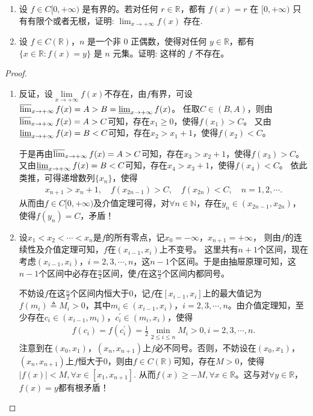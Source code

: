 \documentclass[../../main.tex]{subfiles}
\begin{document}
\begin{example}
\begin{enumerate}
\item 设 \(f\in C[0,+\infty)\) 是有界的。若对任何 \(r\in\mathbb{R}\)，都有 \(f(x)=r\) 在 \([0,+\infty)\) 只有有限个或者无根，证明:
$\lim_{x \to +\infty} f(x) \text{ 存在}.$

\item 设 \(f\in C(\mathbb{R})\)，\(n\) 是一个非 \(0\) 正偶数，使得对任何 \(y\in\mathbb{R}\)，都有 \(\{x\in\mathbb{R}:f(x)=y\}\) 是 \(n\) 元集。证明: 这样的 \(f\) 不存在。 
\end{enumerate}
\end{example}
\begin{proof}
\begin{enumerate}
\item 反证，设\(\lim\limits_{x \to +\infty} f(x)\)不存在，由\(f\)有界，可设\(\varlimsup_{x \to +\infty} f(x)=A > B=\varliminf_{x \to +\infty} f(x)\)。
任取\(C\in (B,A)\)，则由\(\varlimsup_{x \to +\infty} f(x)=A > C\)可知，存在\(x_1\geqslant 0\)，使得\(f(x_1)>C\)。
又由\(\varliminf_{x \to +\infty} f(x)=B < C\)可知，存在\(x_2 > x_1 + 1\)，使得\(f(x_2)<C\)。

于是再由\(\varlimsup_{x \to +\infty} f(x)=A > C\)可知，存在\(x_3 > x_2 + 1\)，使得\(f(x_3)>C\)。
又由\(\varliminf_{x \to +\infty} f(x)=B < C\)可知，存在\(x_4 > x_3 + 1\)，使得\(f(x_4)<C\)。
依此类推，可得递增数列\(\{x_n\}\)，使得
\begin{align*}
x_{n + 1} > x_n + 1, \quad f(x_{2n - 1}) > C, \quad f(x_{2n}) < C, \quad n = 1,2,\cdots.
\end{align*}
从而由\(f\in C[0,+\infty)\)及介值定理可得，对\(\forall n\in\mathbb{N}\)，存在\(y_n\in (x_{2n - 1},x_{2n})\)，使得\(f(y_n)=C\)，矛盾！ 

\item 设\(x_1<x_2<\cdots <x_n\)是\(f\)的所有零点，记\(x_0 = -\infty\)，\(x_{n + 1} = +\infty\)，
则由\(f\)的连续性及介值定理可知，\(f\)在\(( x_{i - 1},x_i )\)上不变号。
这里共有\(n + 1\)个区间，现在考虑\(( x_{i - 1},x_i )\)，\(i = 2,3,\cdots,n\)，这\(n - 1\)个区间。于是由抽屉原理可知，这\(n - 1\)个区间中必存在\(\frac{n}{2}\)区间，使\(f\)在这\(\frac{n}{2}\)个区间内都同号。

不妨设\(f\)在这\(\frac{n}{2}\)个区间内恒大于\(0\)，记\(f\)在\([ x_{i - 1},x_i ]\)上的最大值记为\(f( m_i ) \triangleq M_i>0\)，其中\(m_i\in ( x_{i - 1},x_i )\)，\(i = 2,3,\cdots,n\)。由介值定理知，至少存在\(c_i\in ( x_{i - 1},m_i )\)，\(c_{i}^{\prime}\in ( m_i,x_i )\)，使得
\begin{align*}
f( c_i ) =f( c_{i}^{\prime} ) =\frac{1}{2}\underset{2\leq i\leq n}{\min}M_i>0,i = 2,3,\cdots,n.
\end{align*}
注意到在\(( x_0,x_1 )\)，\(( x_n,x_{n + 1} )\)上\(f\)必不同号。否则，不妨设在\(( x_0,x_1 )\)，\(( x_n,x_{n + 1} )\)上\(f\)恒大于\(0\)，则由\(f\in C( \mathbb{R} )\)可知，存在\(M>0\)，使得
\(\left| f( x ) \right|<M,\forall x\in [ x_1,x_{n + 1} ].\)
从而\(f( x ) \geqslant -M,\forall x\in \mathbb{R} \)。这与对\(\forall y\in \mathbb{R} \)，\(f( x ) =y\)都有根矛盾！


\end{enumerate}
\end{proof}
\end{document}
